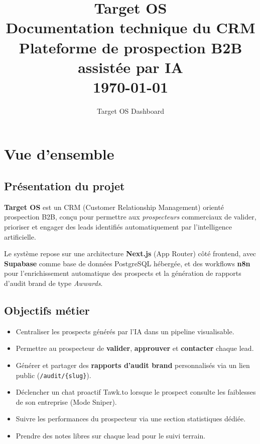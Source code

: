 \documentclass[11pt,a4paper]{report}
\begin{document}
\title{
  \vspace{2cm}
  {\Huge\bfseries Target OS}\\[0.5cm]
  {\LARGE Documentation technique du CRM}\\[0.3cm]
  {\large Plateforme de prospection B2B assistée par IA}\\[1.5cm]
  {\small \today}
}
\author{Target OS Dashboard}
\date{}
\maketitle
\thispagestyle{empty}
\tableofcontents
\newpage

\chapter{Vue d'ensemble}

\section{Présentation du projet}

\textbf{Target OS} est un CRM (Customer Relationship Management) orienté prospection B2B, conçu pour permettre aux \emph{prospecteurs} commerciaux de valider, prioriser et engager des leads identifiés automatiquement par l'intelligence artificielle.

Le système repose sur une architecture \textbf{Next.js} (App Router) côté frontend, avec \textbf{Supabase} comme base de données PostgreSQL hébergée, et des workflows \textbf{n8n} pour l'enrichissement automatique des prospects et la génération de rapports d'audit brand de type \emph{Awwards}.

\section{Objectifs métier}

\begin{itemize}[leftmargin=*]
  \item Centraliser les prospects générés par l'IA dans un pipeline visualisable.
  \item Permettre au prospecteur de \textbf{valider}, \textbf{approuver} et \textbf{contacter} chaque lead.
  \item Générer et partager des \textbf{rapports d'audit brand} personnalisés via un lien public (\texttt{/audit/\{slug\}}).
  \item Déclencher un chat proactif Tawk.to lorsque le prospect consulte les faiblesses de son entreprise (Mode Sniper).
  \item Suivre les performances du prospecteur via une section statistiques dédiée.
  \item Prendre des notes libres sur chaque lead pour le suivi terrain.
\end{itemize}
\end{document}
